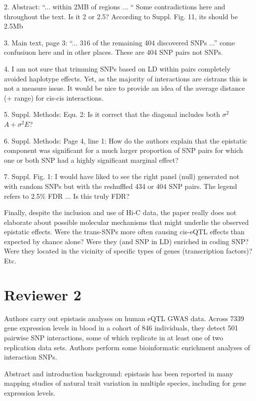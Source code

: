 \documentclass{article}
\begin{document}
2. Abstract: “... within 2MB of regions ... “ Some contradictions here and throughout the text. Is it 2 or 2.5? According to Suppl. Fig. 11, its should be 2.5Mb

3. Main text, page 3: “... 316 of the remaining 404 discovered SNPs ...” come confusiuon here and in other places. These are 404 SNP pairs not SNPs.

4. I am not sure that trimming SNPs based on LD within pairs completely avoided haplotype effects. Yet, as the majority of interactions are cistrans this is not a measure issue. It would be nice to provide an idea of the average distance (+ range) for cis-cis interactions.

5. Suppl. Methods: Equ. 2: Is it correct that the diagonal includes both $\sigma^2$ $A + \sigma^2 E$?

6. Suppl. Methods: Page 4, line 1: How do the authors explain that the epistatic component was significant for a much larger proportion of SNP pairs for which one or both SNP had a highly significant marginal effect?

7. Suppl. Fig. 1: I would have liked to see the right panel (null) generated not with random SNPs but with the reshuffled 434 or 404 SNP pairs. The legend refers to 2.5\% FDR ... Is this truly FDR?

Finally, despite the inclusion and use of Hi-C data, the paper really does not elaborate about possible molecular mechanisms that might underlie the observed epistatic effects. Were the trans-SNPs more often causing cis-eQTL
effects than expected by chance alone? Were they (and SNP in LD) enriched in coding SNP? Were they located in the vicinity of specific types of genes (transcription factors)? Etc.

\section{Reviewer 2}

Authors carry out epistasis analyses on human eQTL GWAS data. Across 7339 gene expression levels in blood in a cohort of 846 individuals, they detect 501 pairwise SNP interactions, some of which replicate in at least one of two replication data sets. Authors perform some bioinformatic enrichment analyses of interaction SNPs.

Abstract and introduction background: epistasis has been reported in many mapping studies of natural trait variation in multiple species, including for gene expression levels.
\end{document}
